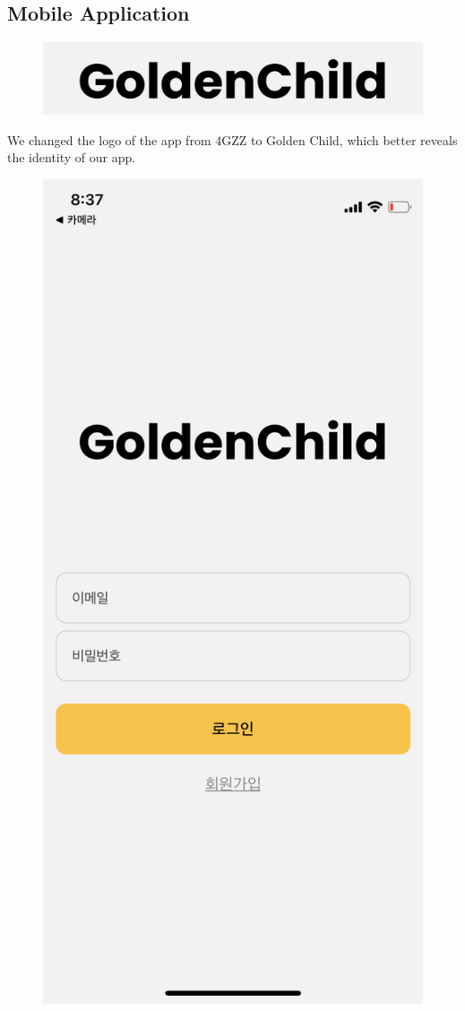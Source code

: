 \documentclass[conference]{IEEEtran}
\begin{document}
\subsection{Mobile Application}
\begin{figure}[H]
\centering
\includegraphics[scale=0.1]{UseCases/1.newlogo.jpg}
\end{figure}
We changed the logo of the app from 4GZZ to Golden Child, which better reveals the identity of our app.
\begin{figure}[H]
\centering
\includegraphics[scale=0.1]{UseCases/2.login.png}
\end{figure}
\end{document}
